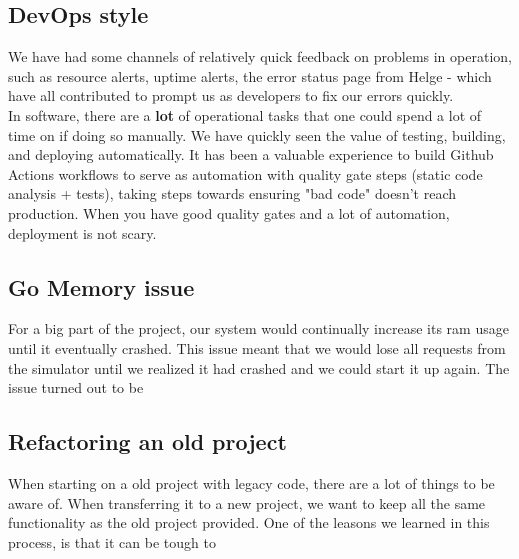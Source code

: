\subsection{DevOps style}
We have had some channels of relatively quick feedback on problems in operation, such as resource alerts, uptime alerts, the error status page from Helge - which have all contributed to prompt us as developers to fix our errors quickly. \\
In software, there are a \textbf{lot} of operational tasks that one could spend a lot of time on if doing so manually. We have quickly seen the value of testing, building, and deploying automatically. It has been a valuable experience to build Github Actions workflows to serve as automation with quality gate steps (static code analysis + tests), taking steps towards ensuring "bad code" doesn't reach production.  
When you have good quality gates and a lot of automation, deployment is not scary.
 
\subsection{Go Memory issue}
For a big part of the project, our system would continually increase its ram usage until it eventually crashed. This issue meant that we would lose all requests from the simulator until we realized it had crashed and we could start it up again. The issue turned out to be 

\subsection{Refactoring an old project}
When starting on a old project with legacy code, there are a lot of things to be aware of. When transferring it to a new project, we want to keep all the same functionality as the old project provided. One of the leasons we learned in this process, is that it can be tough to
